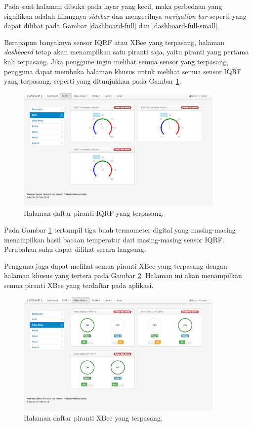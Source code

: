 			Pada saat halaman dibuka pada layar yang kecil, maka perbedaan yang signifikan adalah hilangnya \emph{sidebar} dan mengecilnya \emph{navigation bar} seperti yang dapat dilihat pada Gambar \ref{dashboard-full} dan \ref{dashboard-full-small}.

			Berapapun banyaknya sensor IQRF atau XBee yang terpasang, halaman \emph{dashboard} tetap akan menampilkan satu piranti saja, yaitu piranti yang pertama kali terpasang. Jika penggune ingin melihat semua sensor yang terpasang, pengguna dapat membuka halaman khusus untuk melihat semua sensor IQRF yang terpasang, seperti yang ditunjukkan pada Gambar \ref{iqrf-list}.

				\begin{figure}[H]
				  \centering
				    \includegraphics[width=0.9\textwidth]{gambar/iqrf-list}
				    \caption{Halaman daftar piranti IQRF yang terpasang.}
				    \label{iqrf-list}
				\end{figure}

			Pada Gambar \ref{iqrf-list} tertampil tiga buah termometer digital yang masing-masing menampilkan hasil bacaan temperatur dari masing-masing sensor IQRF. Perubahan suhu dapat dilihat secara langsung.

			Pengguna juga dapat melihat semua piranti XBee yang terpasang dengan halaman khusus yang tertera pada Gambar \ref{xbee-list}. Halaman ini akan menampilkan semua piranti XBee yang terdaftar pada aplikasi.

				\begin{figure}[H]
				  \centering
				    \includegraphics[width=0.9\textwidth]{gambar/xbee-list}
				    \caption{Halaman daftar piranti XBee yang terpasang.}
				    \label{xbee-list}
				\end{figure}

